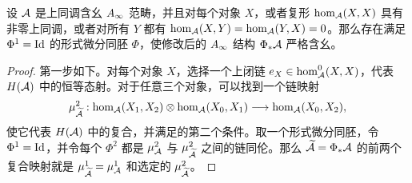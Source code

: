 \begin{lemma}\label{st:2.1}
设 $\mathcal A$ 是上同调含幺 $A_\infty$ 范畴，并且对每个对象 $X$，或者复形 $\hom_{\mathcal A}(X,X)$ 具有非零上同调，或者对所有 $Y$ 都有 $\hom_{\mathcal A}(X,Y)=\hom_{\mathcal A}(Y,X)=0$。那么存在满足 $\Phi^1=\operatorname{Id}$ 的形式微分同胚 $\Phi$，使修改后的 $A_\infty$ 结构 $\Phi_*\mathcal A$ 严格含幺。
\end{lemma}
\begin{proof}
第一步如下。对每个对象 $X$，选择一个上闭链 $e_X\in\hom^0_{\mathcal A}(X,X)$，代表 $H(\mathcal A)$ 中的恒等态射。对于任意三个对象，可以找到一个链映射
\[
\mu^2_{\widetilde{\mathcal A}}:\hom_{\mathcal A}(X_1,X_2)\otimes\hom_{\mathcal A}(X_0,X_1)\longrightarrow\hom_{\mathcal A}(X_0,X_2),
\]
使它代表 $H(\mathcal A)$ 中的复合，并满足的第二个条件。取一个形式微分同胚，令 $\Phi^1=\operatorname{Id}$，并令每个 $\Phi^2$ 都是 $\mu^2_{\mathcal A}$ 与 $\mu^2_{\widetilde{\mathcal A}}$ 之间的链同伦。那么 $\widetilde{\mathcal A}=\Phi_*\mathcal A$ 的前两个复合映射就是 $\mu^1_{\widetilde{\mathcal A}}=\mu^1_{\mathcal A}$ 和选定的 $\mu^2_{\widetilde{\mathcal A}}$。


\end{proof}
